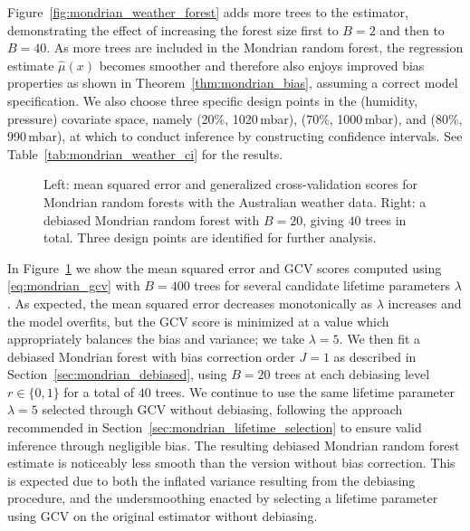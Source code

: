 \documentclass[11pt,lof]{puthesis}
\theoremstyle{break}
\theoremstyle{proof}
\begin{document}
Figure~\ref{fig:mondrian_weather_forest} adds more trees to the estimator,
demonstrating the effect of increasing the forest size first to $B=2$
and then to $B=40$.
As more trees are included in the Mondrian random forest,
the regression estimate $\hat \mu(x)$ becomes smoother and therefore also
enjoys improved bias properties as shown in
Theorem~\ref{thm:mondrian_bias}, assuming a correct model specification.
We also choose three specific design points in the
(humidity, pressure) covariate space,
namely (20\%, 1020\,mbar), (70\%, 1000\,mbar), and (80\%, 990\,mbar),
at which to conduct inference
by constructing confidence intervals. See Table~\ref{tab:mondrian_weather_ci}
for the results.

\begin{figure}[b!]
  \centering
  \begin{subfigure}{0.49\textwidth}
    \centering
  \end{subfigure}
  \begin{subfigure}{0.49\textwidth}
    \centering
  \end{subfigure}
  \caption[Cross-validation and debiasing for the Australian weather data]{
    Left: mean squared error and generalized cross-validation scores
    for Mondrian random forests with the Australian weather data.
    Right: a debiased Mondrian random forest with $B=20$, giving $40$ trees
  in total. Three design points are identified for further analysis.}
  \label{fig:mondrian_weather_gcv}
\end{figure}

In Figure~\ref{fig:mondrian_weather_gcv} we show the mean squared error and GCV
scores
computed using \eqref{eq:mondrian_gcv} with $B=400$ trees
for several candidate lifetime parameters $\lambda$. As
expected, the mean squared error decreases monotonically
as $\lambda$ increases and the model
overfits, but the GCV score is minimized at a value which appropriately
balances the bias and variance; we take $\lambda = 5$.
We then fit a debiased Mondrian forest
with bias correction order $J = 1$ as described in
Section~\ref{sec:mondrian_debiased}, using $B=20$ trees at each debiasing level
$r \in \{0, 1\}$ for a total of $40$ trees.
We continue to use the same lifetime parameter
$\lambda = 5$ selected through GCV without debiasing, following the approach
recommended in Section~\ref{sec:mondrian_lifetime_selection} to ensure valid
inference
through negligible bias.
The resulting debiased Mondrian random forest estimate is noticeably
less smooth than the version without bias correction.
This is expected due to both the inflated variance resulting from the debiasing
procedure, and the undersmoothing enacted by selecting a lifetime parameter
using GCV on the original estimator without debiasing.
\end{document}
